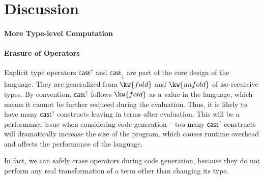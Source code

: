 \section{Discussion}
\paragraph{More Type-level Computation}


\paragraph{Erasure of \cast Operators}

Explicit type \cast operators $ \mathsf{cast}^{\uparrow} $ and $ \mathsf{cast}_{\downarrow} $ are part of the core design of the language. They are generalized from $\kw{fold}$ and $\kw{unfold}$ of iso-recursive types. By convention, $ \mathsf{cast}^{\uparrow} $ follows $\kw{fold}$ as a value in the language, which means it cannot be further reduced during the evaluation. Thus, it is likely to have many $ \mathsf{cast}^{\uparrow} $ constructs leaving in terms after evaluation. This will be a performance issue when considering code generation -- too many $ \mathsf{cast}^{\uparrow} $ constructs will dramatically increase the size of the program, which causes runtime overhead and affects the performance of the language.

In fact, we can safely erase \cast operators during code generation, because they do not perform any real transformation of a term other than changing its type. 
